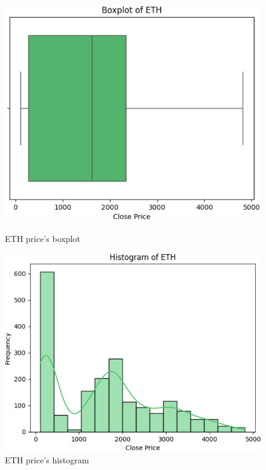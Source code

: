 \documentclass{ieeeojies}
\begin{document}
\begin{figure}[H]
    \centering
    \begin{minipage}{0.23\textwidth}
    \centering
    \includegraphics[width=1\textwidth]{image/eth1.png}
    \caption{ETH price's boxplot}
    \label{fig:1}
    \end{minipage}
    \hfill
    \begin{minipage}{0.23\textwidth}
    \centering
    \includegraphics[width=1\textwidth]{image/eth2.png}
    \caption{ETH price's histogram}
    \label{fig:2}
    \end{minipage}
\end{figure}
\end{document}
